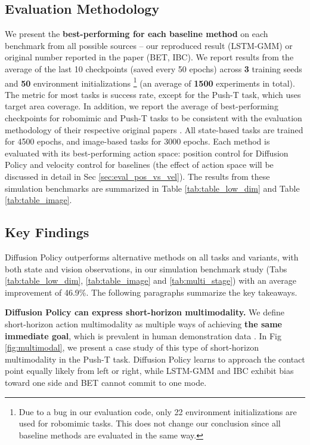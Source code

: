 \subsection{Evaluation Methodology}
We present the \textbf{best-performing for each baseline method} on each benchmark from all possible sources -- our reproduced result (LSTM-GMM) or original number reported in the paper (BET, IBC). We report results from the average of the last 10 checkpoints (saved every 50 epochs) across \textbf{3} training seeds and \textbf{50} environment initializations 
\footnote{Due to a bug in our evaluation code, only 22 environment initializations are used for robomimic tasks. This does not change our conclusion since all baseline methods are evaluated in the same way.} 
(an average of \textbf{1500} experiments in total). The metric for most tasks is success rate, except for the Push-T task, which uses target area coverage.
In addition, we report the average of best-performing checkpoints for robomimic and Push-T tasks to be consistent with the evaluation methodology of their respective original papers \cite{robomimic, ibc}. All state-based tasks are trained for 4500 epochs, and image-based tasks for 3000 epochs. Each method is evaluated with its best-performing action space: position control for Diffusion Policy and velocity control for baselines (the effect of action space will be discussed in detail in Sec \ref{sec:eval_pos_vs_vel}).  
The results from these simulation benchmarks are summarized in Table \ref{tab:table_low_dim} and Table \ref{tab:table_image}.


\subsection{Key Findings}

Diffusion Policy outperforms alternative methods on all tasks and variants, with both state and vision observations, in our simulation benchmark study (Tabs \ref{tab:table_low_dim}, \ref{tab:table_image} and \ref{tab:multi_stage}) with an average improvement of 46.9\%. The following paragraphs summarize the key takeaways.  


\textbf{Diffusion Policy can express short-horizon multimodality.}
We define short-horizon action multimodality as multiple ways of achieving \textbf{the same immediate goal}, which is prevalent in human demonstration data \cite{robomimic}. 
In Fig \ref{fig:multimodal}, we present a case study of this type of short-horizon multimodality in the Push-T task. Diffusion Policy learns to approach the contact point equally likely from left or right, while LSTM-GMM \cite{robomimic} and IBC \cite{ibc} exhibit bias toward one side and BET \cite{bet} cannot commit to one mode.








